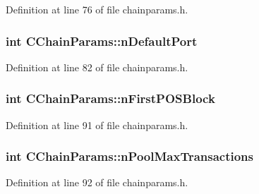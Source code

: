 Definition at line 76 of file chainparams.\+h.

\hypertarget{class_c_chain_params_a76d9a8dc59e179ca94b6b9e04a93e5f4}{}
\subsubsection[{n\+Default\+Port}]{\setlength{\rightskip}{0pt plus 5cm}int C\+Chain\+Params\+::n\+Default\+Port\hspace{0.3cm}{\ttfamily [protected]}}\label{class_c_chain_params_a76d9a8dc59e179ca94b6b9e04a93e5f4}


Definition at line 82 of file chainparams.\+h.

\hypertarget{class_c_chain_params_ac02f29aa14f74f88b64b7d8d71329a49}{}
\subsubsection[{n\+First\+P\+O\+S\+Block}]{\setlength{\rightskip}{0pt plus 5cm}int C\+Chain\+Params\+::n\+First\+P\+O\+S\+Block\hspace{0.3cm}{\ttfamily [protected]}}\label{class_c_chain_params_ac02f29aa14f74f88b64b7d8d71329a49}


Definition at line 91 of file chainparams.\+h.

\hypertarget{class_c_chain_params_addb1962eb12784aaea932fd49b5fd40b}{}
\subsubsection[{n\+Pool\+Max\+Transactions}]{\setlength{\rightskip}{0pt plus 5cm}int C\+Chain\+Params\+::n\+Pool\+Max\+Transactions\hspace{0.3cm}{\ttfamily [protected]}}\label{class_c_chain_params_addb1962eb12784aaea932fd49b5fd40b}


Definition at line 92 of file chainparams.\+h.

\hypertarget{class_c_chain_params_a0f7d46a1493876d522cb594cc8e7924f}{}
